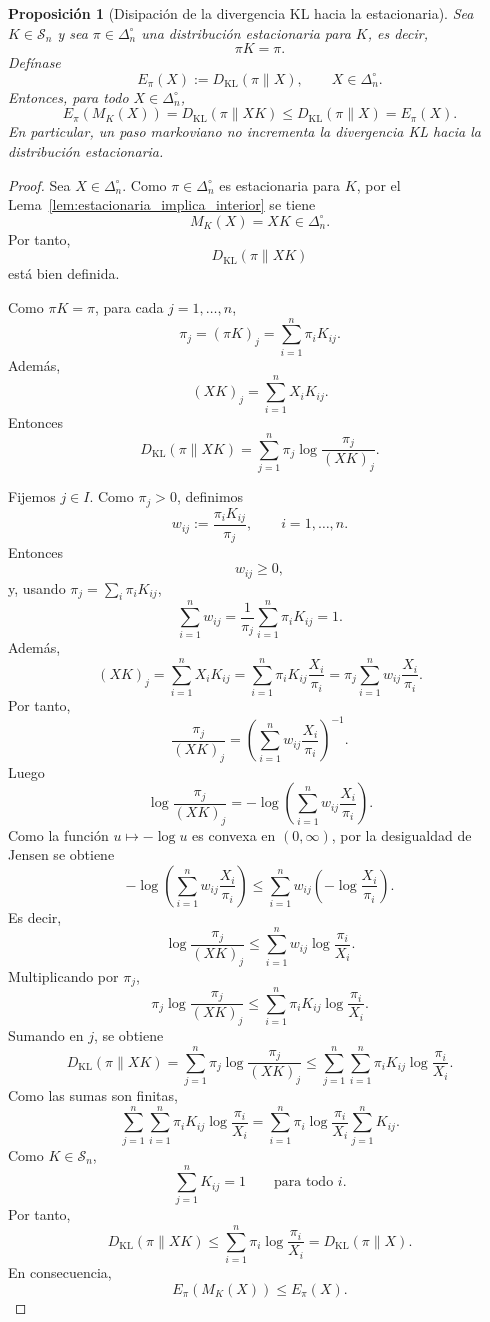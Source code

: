 ﻿\documentclass[12pt]{article}
\newtheorem{proposicion}{Proposición}[section]
\begin{document}
\begin{proposicion}[Disipación de la divergencia KL hacia la estacionaria]\label{prop:disipacion_KL_markov}
Sea \(K\in\mathcal S_n\) y sea \(\pi\in\Delta_n^\circ\) una distribución estacionaria para \(K\), es decir,
\[
\pi K=\pi.
\]
Defínase
\[
E_\pi(X):=D_{\mathrm{KL}}(\pi\|X),
\qquad X\in\Delta_n^\circ.
\]
Entonces, para todo \(X\in\Delta_n^\circ\),
\[
E_\pi(M_K(X))
=
D_{\mathrm{KL}}(\pi\|XK)
\le
D_{\mathrm{KL}}(\pi\|X)
=
E_\pi(X).
\]
En particular, un paso markoviano no incrementa la divergencia KL hacia la distribución estacionaria.
\end{proposicion}

\begin{proof}
Sea \(X\in\Delta_n^\circ\). Como \(\pi\in\Delta_n^\circ\) es estacionaria para \(K\), por el Lema~\ref{lem:estacionaria_implica_interior} se tiene
\[
M_K(X)=XK\in\Delta_n^\circ.
\]
Por tanto,
\[
D_{\mathrm{KL}}(\pi\|XK)
\]
está bien definida.

Como \(\pi K=\pi\), para cada \(j=1,\dots,n\),
\[
\pi_j=(\pi K)_j=\sum_{i=1}^n\pi_iK_{ij}.
\]
Además,
\[
(XK)_j=\sum_{i=1}^n X_iK_{ij}.
\]
Entonces
\[
D_{\mathrm{KL}}(\pi\|XK)
=
\sum_{j=1}^n
\pi_j
\log\frac{\pi_j}{(XK)_j}.
\]

Fijemos \(j\in I\). Como \(\pi_j>0\), definimos
\[
w_{ij}:=\frac{\pi_iK_{ij}}{\pi_j},
\qquad i=1,\dots,n.
\]
Entonces
\[
w_{ij}\ge 0,
\]
y, usando \(\pi_j=\sum_i\pi_iK_{ij}\),
\[
\sum_{i=1}^n w_{ij}
=
\frac{1}{\pi_j}
\sum_{i=1}^n\pi_iK_{ij}
=
1.
\]
Además,
\[
(XK)_j
=
\sum_{i=1}^n X_iK_{ij}
=
\sum_{i=1}^n
\pi_iK_{ij}\frac{X_i}{\pi_i}
=
\pi_j\sum_{i=1}^n w_{ij}\frac{X_i}{\pi_i}.
\]
Por tanto,
\[
\frac{\pi_j}{(XK)_j}
=
\left(
\sum_{i=1}^n w_{ij}\frac{X_i}{\pi_i}
\right)^{-1}.
\]
Luego
\[
\log\frac{\pi_j}{(XK)_j}
=
-\log\left(
\sum_{i=1}^n w_{ij}\frac{X_i}{\pi_i}
\right).
\]
Como la función \(u\mapsto-\log u\) es convexa en \((0,\infty)\), por la desigualdad de Jensen se obtiene
\[
-\log\left(
\sum_{i=1}^n w_{ij}\frac{X_i}{\pi_i}
\right)
\le
\sum_{i=1}^n
w_{ij}
\left(
-\log\frac{X_i}{\pi_i}
\right).
\]
Es decir,
\[
\log\frac{\pi_j}{(XK)_j}
\le
\sum_{i=1}^n
w_{ij}
\log\frac{\pi_i}{X_i}.
\]
Multiplicando por \(\pi_j\),
\[
\pi_j
\log\frac{\pi_j}{(XK)_j}
\le
\sum_{i=1}^n
\pi_iK_{ij}
\log\frac{\pi_i}{X_i}.
\]
Sumando en \(j\), se obtiene
\[
D_{\mathrm{KL}}(\pi\|XK)
=
\sum_{j=1}^n
\pi_j
\log\frac{\pi_j}{(XK)_j}
\le
\sum_{j=1}^n
\sum_{i=1}^n
\pi_iK_{ij}
\log\frac{\pi_i}{X_i}.
\]
Como las sumas son finitas,
\[
\sum_{j=1}^n
\sum_{i=1}^n
\pi_iK_{ij}
\log\frac{\pi_i}{X_i}
=
\sum_{i=1}^n
\pi_i
\log\frac{\pi_i}{X_i}
\sum_{j=1}^nK_{ij}.
\]
Como \(K\in\mathcal S_n\),
\[
\sum_{j=1}^nK_{ij}=1
\qquad
\text{para todo }i.
\]
Por tanto,
\[
D_{\mathrm{KL}}(\pi\|XK)
\le
\sum_{i=1}^n
\pi_i
\log\frac{\pi_i}{X_i}
=
D_{\mathrm{KL}}(\pi\|X).
\]
En consecuencia,
\[
E_\pi(M_K(X))\le E_\pi(X).
\]
\end{proof}
\end{document}

